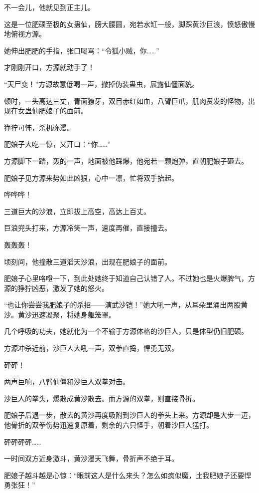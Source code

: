 \begin{this_body}
不一会儿，他就见到正主儿。

这是一位肥硕至极的女蛊仙，膀大腰圆，宛若水缸一般，脚踩黄沙巨浪，愤怒傲慢地俯视方源。

她伸出肥肥的手指，张口喝骂：“令狐小贼，你……”

才刚刚开口，方源就动手了！

“天尸变！”方源故意低喝一声，撤掉伪装蛊虫，展露仙僵面貌。

顿时，一头高达三丈，青面獠牙，双目赤红如血，八臂巨爪，肌肉贲发的怪物，出现在女蛊仙肥娘子的面前。

狰狞可怖，杀机弥漫。

肥娘子大吃一惊，又开口：“你……”

方源脚下一踏，轰的一声，地面被他踩爆，他宛若一颗炮弹，直朝肥娘子砸去。

肥娘子见方源来势如此凶狠，心中一凛，忙将双手抬起。

哗哗哗！

三道巨大的沙浪，立即拔上高空，高达上百丈。

巨浪兜头打来，方源冷笑一声，速度再催，直接撞去。

轰轰轰！

顷刻间，他撞散三道滔天沙浪，出现在肥娘子的面前。

肥娘子心里咯噔一下，到此处她终于知道自己认错了人。不过她也是火爆脾气，方源的狰狞凶恶，激发了她的怒火。

“也让你尝尝我肥娘子的杀招——演武沙铠！”她大吼一声，从耳朵里涌出两股黄沙。黄沙迅速凝聚，将她身躯笼罩。

几个呼吸的功夫，她就化为一个不输于方源体格的沙巨人，只是体型仍旧肥硕。

方源冲杀近前，沙巨人大吼一声，双拳直捣，悍勇无双。

砰砰！

两声巨响，八臂仙僵和沙巨人双拳对击。

沙巨人的拳头，爆散成黄沙散去。而方源的双拳，则直接骨折。

肥娘子后退一步，散去的黄沙再度吸附到沙巨人的拳头上来。方源却是大步一迈，他骨折的双拳伤势迅速复原着，剩余的六只怪手，朝着沙巨人猛打。

砰砰砰砰……

一时间双方近身激斗，黄沙漫天飞舞，骨折声不绝于耳。

肥娘子越斗越是心惊：“眼前这人是什么来头？怎么如疯似魔，比我肥娘子还要悍勇张狂！”

\end{this_body}

